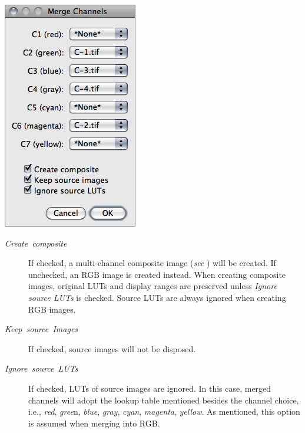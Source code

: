 \begin{minipage}[c][1\totalheight][t]{0.33\columnwidth}%
\includegraphics[scale=0.55]{images/MergeChannels}%
\end{minipage}%
\begin{minipage}[c][1\totalheight][t]{0.67\columnwidth}%
\begin{description}
\item [{\emph{Create\ composite}}] If checked, a multi-channel composite
image (\emph{see} ) will be created.
If unchecked, an RGB image is created instead. When creating composite
images, original LUTs and display ranges are preserved unless \emph{Ignore
source LUTs} is checked. Source LUTs are always ignored when creating
RGB images.
\item [{\emph{Keep\ source\ Images}}] If checked, source images will
not be disposed.
\item [{\emph{Ignore\ source\ LUTs}}] If checked, LUTs of source images
are ignored. In this case, merged channels will adopt the lookup table
mentioned besides the channel choice, i.e., \emph{red}, \emph{gree}n,
\emph{blue}, \emph{gray},\emph{ cyan}, \emph{magenta}, \emph{yellow}.
As mentioned, this option is assumed when merging into RGB.\end{description}
%
\end{minipage}




\subsubsection{\protect{}\label{sub:ChannelsTool-Color}}

